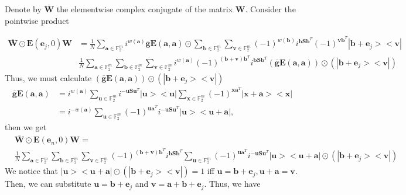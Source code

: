 \documentclass{article}
\begin{document}
\begin{enumerate}
		Denote by $\overline{\mathbf{W}}$ the elementwise complex conjugate of the matrix $\mathbf{W}$. Consider the pointwise product
		
		\begin{align*}
			\overline{\mathbf{W}} \odot \mathbf{E}(\mathbf{e}_j, 0)\mathbf{W}& = \frac{1}{N} \sum_{\mathbf{a} \in \mathbb{F}^m_2} i^{w(\mathbf{a})}\overline{\mathbf{g}}\mathbf{E}(\mathbf{a},\mathbf{a})\odot \sum_{\mathbf{b} \in \mathbb{F}_2^m}{\sum_{\mathbf{v} \in \mathbb{F}_2^m}{ (-1)^{w(\mathbf{b})} i^{\mathbf{b}\mathbf{S}\mathbf{b}^T}(-1)^{\mathbf{v}\mathbf{b}^T} |\mathbf{b}+\mathbf{e}_j><\mathbf{v}|}}\\
			&\frac{1}{N} \sum_{\mathbf{a} \in \mathbb{F}^m_2}{\sum_{\mathbf{b} \in \mathbb{F}_2^m}{\sum_{\mathbf{v} \in \mathbb{F}_2^m}}i^{w(\mathbf{a})}(-1)^{(\mathbf{b+v})\mathbf{b}^T}  i^{\mathbf{b}\mathbf{S}\mathbf{b}^T} (\overline{\mathbf{g}}\mathbf{E}(\mathbf{a},\mathbf{a}))\odot (|\mathbf{b}+\mathbf{e}_j><\mathbf{v}|) }
		\end{align*}
		Thus, we must calculate $(\overline{\mathbf{g}}\mathbf{E}(\mathbf{a},\mathbf{a}))\odot (|\mathbf{b}+\mathbf{e}_j><\mathbf{v}|)$
		\begin{align*}
			\overline{\mathbf{g}}\mathbf{E}(\mathbf{a},\mathbf{a}) &=i^{w(\mathbf{a})} \sum_{\mathbf{u} \in \mathbb{F}_2^m}{i^{-\mathbf{u S}\mathbf{u}^T} |\mathbf{u}><\mathbf{u}|}\sum_{\mathbf{x} \in \mathbb{F}_2^m}{ (-1)^{\mathbf{x}\mathbf{a}^T}|\mathbf{x+a}><\mathbf{x}|} \\
			&=i^{-w(\mathbf{a})} \sum_{\mathbf{u} \in \mathbb{F}_2^m}{(-1)^{\mathbf{u}\mathbf{a}^T}i^{-\mathbf{u S}\mathbf{u}^T} |\mathbf{u}><\mathbf{u+a}|},
		\end{align*} 
		then we get
		\begin{align*}
			&\overline{\mathbf{W}} \odot \mathbf{E}(\mathbf{e}_n, 0)\mathbf{W} = \\
			& \frac{1}{N} \sum_{\mathbf{a} \in \mathbb{F}^m_2}{\sum_{\mathbf{b} \in \mathbb{F}_2^m}{\sum_{\mathbf{v} \in \mathbb{F}_2^m}}(-1)^{(\mathbf{b+v})\mathbf{b}^T}  i^{\mathbf{b}\mathbf{S}\mathbf{b}^T} \sum_{\mathbf{u} \in \mathbb{F}_2^m}{(-1)^{\mathbf{u}\mathbf{a}^T}i^{-\mathbf{u S}\mathbf{u}^T} |\mathbf{u}><\mathbf{u+a}|} \odot (|\mathbf{b}+\mathbf{e}_j><\mathbf{v}|) }
		\end{align*}
		We notice that $|\mathbf{u}><\mathbf{u+a}| \odot (|\mathbf{b}+\mathbf{e}_j><\mathbf{v}|) = 1$ iff $\mathbf{u}=\mathbf{b}+\mathbf{e}_j, \mathbf{u+a}=\mathbf{v}$. Then, we can substitute $\mathbf{u} = \mathbf{b}+\mathbf{e}_j$ and $\mathbf{v}=\mathbf{a}+\mathbf{b}+\mathbf{e}_j$. Thus, we have

\end{enumerate}
\end{document}
